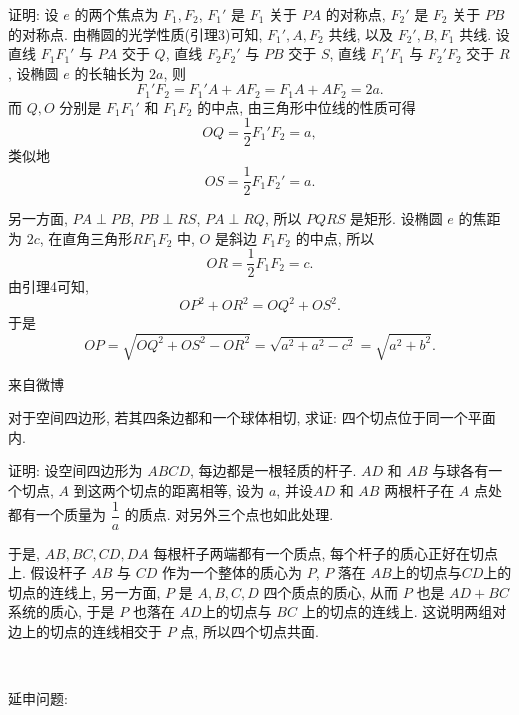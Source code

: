 证明: 设 $e$ 的两个焦点为 $F_1,F_2$, $F_1'$ 是 $F_1$ 关于 $PA$ 的对称点, $F_2'$ 是 $F_2$ 关于 $PB$ 的对称点. 由椭圆的光学性质(引理3)可知, $F_1', A, F_2$ 共线, 以及 $F_2', B, F_1$ 共线. 设直线 $F_1F_1'$ 与 $PA$ 交于 $Q$, 直线 $F_2F_2'$ 与 $PB$ 交于 $S$, 直线 $F_1'F_1$ 与 $F_2'F_2$ 交于 $R$, 设椭圆 $e$ 的长轴长为 $2a$, 则 
\[ F_1'F_2 = F_1'A + AF_2 = F_1A+AF_2 = 2a .\]
而 $Q,O$ 分别是 $F_1F_1'$ 和 $F_1F_2$ 的中点, 由三角形中位线的性质可得 
$$OQ = \dfrac{1}{2}F_1'F_2 = a,$$ 
类似地 
$$OS = \dfrac{1}{2}F_1F_2' = a.$$

另一方面, $PA\perp PB$, $PB\perp RS$, $PA \perp RQ$, 所以 $PQRS$ 是矩形. 设椭圆 $e$ 的焦距为 $2c$, 在直角三角形$RF_1F_2$ 中, $O$ 是斜边 $F_1F_2$ 的中点, 所以 
$$OR = \dfrac{1}{2} F_1F_2 = c.$$
由引理4可知, 
\[OP^2 + OR^2 = OQ^2 + OS^2 .\]
于是
\[OP = \sqrt{ OQ^2 + OS^2 - OR^2} = \sqrt{a^2+a^2-c^2} = \sqrt{a^2+b^2} .\]

\newpage

\noindent 来自微博

对于空间四边形, 若其四条边都和一个球体相切, 求证: 四个切点位于同一个平面内.
\begin{figure*}[htbp]
\centering
{}
\end{figure*}

证明: 设空间四边形为 $ABCD$, 每边都是一根轻质的杆子. $AD$ 和 $AB$ 与球各有一个切点, $A$ 到这两个切点的距离相等, 设为 $a$, 并设$AD$ 和 $AB$ 两根杆子在 $A$ 点处都有一个质量为 $\dfrac{1}{a}$ 的质点. 对另外三个点也如此处理. 

于是, $AB, BC, CD, DA$ 每根杆子两端都有一个质点, 每个杆子的质心正好在切点上. 假设杆子 $AB$ 与 $CD$ 作为一个整体的质心为 $P$, $P$ 落在 $AB$上的切点与$CD$上的切点的连线上, 另一方面, $P$ 是 $A,B,C,D$ 四个质点的质心, 从而 $P$ 也是 $AD + BC$ 系统的质心, 于是 $P$ 也落在 $AD$上的切点与 $BC$ 上的切点的连线上. 这说明两组对边上的切点的连线相交于 $P$ 点, 所以四个切点共面.

~

\noindent 延申问题: 

